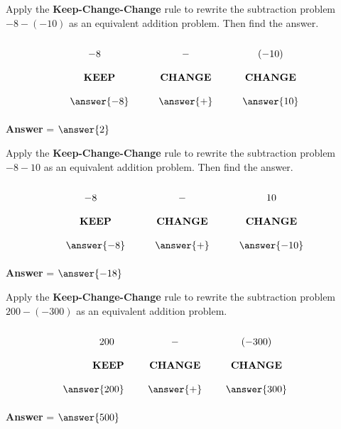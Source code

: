 \documentclass{ximera}[font=12pt]
\begin{document}
\begin{problem} Apply the \textbf{Keep-Change-Change} rule to rewrite the subtraction problem $-8 -(-10)$ as an equivalent addition problem. Then find the answer.

\[ 
\renewcommand{\arraystretch}{2} 
\begin{array}{c @{\hskip 30pt} c @{\hskip 30pt} c} 
-8 \quad & - & (-10) \\ 
\textbf{KEEP} & \textbf{CHANGE} & \textbf{CHANGE} \\ 
\answer{-8} & \answer{+}   & \answer{10} 
\end{array} 
\] 

\textcolor{orange!80!black}{\textbf{Answer}} = $\answer{2}$ 
\end{problem}


\begin{problem} Apply the \textbf{Keep-Change-Change} rule to rewrite the subtraction problem $-8-10$ as an 
equivalent addition problem. Then find the answer.

\[ 
\renewcommand{\arraystretch}{2} 
\begin{array}{c @{\hskip 30pt} c @{\hskip 30pt} c} 
-8 \quad & - & 10 \\ 
\textbf{KEEP} & \textbf{CHANGE} & \textbf{CHANGE} \\ 
\answer{-8} & \answer{+}   & \answer{-10} 
\end{array} 
\] 

\textcolor{orange!80!black}{\textbf{Answer}} = $\answer{-18}$ 
\end{problem}


\begin{problem}
    Apply the \textbf{Keep-Change-Change} rule to rewrite the subtraction problem $200 -(-300)$ as an equivalent 
    addition problem.  

    \[
    \renewcommand{\arraystretch}{2}
    \begin{array}{r @{\hskip 24pt} c @{\hskip 24pt} c @{\hskip 24pt} c}
    200 \quad & - & (-300) \\
    \textbf{KEEP} & \textbf{CHANGE} & \textbf{CHANGE} \\
    \answer{200} & \answer{+} & \answer{300}
    \end{array}
    \]

\textcolor{orange!80!black}{\textbf{Answer}} = $\answer{500}$
                                                   
\end{problem}    
\end{document}
